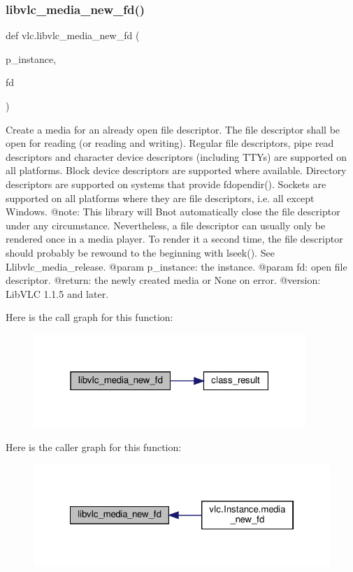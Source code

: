 \subsubsection{\texorpdfstring{libvlc\+\_\+media\+\_\+new\+\_\+fd()}{libvlc\_media\_new\_fd()}}
{\footnotesize\ttfamily def vlc.\+libvlc\+\_\+media\+\_\+new\+\_\+fd (\begin{DoxyParamCaption}\item[{}]{p\+\_\+instance,  }\item[{}]{fd }\end{DoxyParamCaption})}

\begin{DoxyVerb}Create a media for an already open file descriptor.
The file descriptor shall be open for reading (or reading and writing).
Regular file descriptors, pipe read descriptors and character device
descriptors (including TTYs) are supported on all platforms.
Block device descriptors are supported where available.
Directory descriptors are supported on systems that provide fdopendir().
Sockets are supported on all platforms where they are file descriptors,
i.e. all except Windows.
@note: This library will B{not} automatically close the file descriptor
under any circumstance. Nevertheless, a file descriptor can usually only be
rendered once in a media player. To render it a second time, the file
descriptor should probably be rewound to the beginning with lseek().
See L{libvlc_media_release}.
@param p_instance: the instance.
@param fd: open file descriptor.
@return: the newly created media or None on error.
@version: LibVLC 1.1.5 and later.
\end{DoxyVerb}
 Here is the call graph for this function\+:
\nopagebreak
\begin{figure}[H]
\begin{center}
\leavevmode
\includegraphics[width=292pt]{namespacevlc_ab47a8f7f91485525472a13de0e66b7ff_cgraph}
\end{center}
\end{figure}
Here is the caller graph for this function\+:
\nopagebreak
\begin{figure}[H]
\begin{center}
\leavevmode
\includegraphics[width=322pt]{namespacevlc_ab47a8f7f91485525472a13de0e66b7ff_icgraph}
\end{center}
\end{figure}
